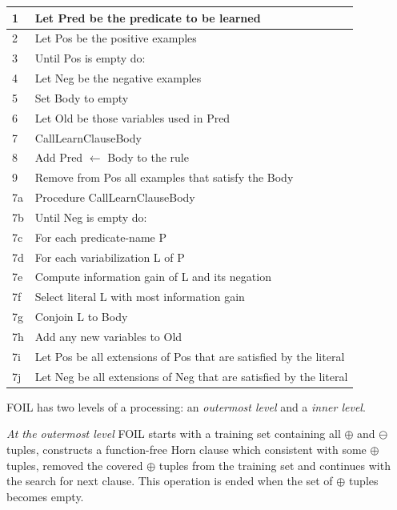 \documentclass{scrartcl}
\begin{document}
\begin{tabular}{|l|l|} %
  \hline
  1 & Let Pred be the predicate to be learned  \\
  \hline
  2 & Let Pos be the positive examples  \\
  \hline
  3 & Until Pos is empty do:  \\
  \hline
  4 &   \qquad Let Neg be the negative examples \\
  \hline
  5 &   \qquad Set Body to empty \\
  \hline
  6 &   \qquad Let Old be those variables used in Pred \\
  \hline
  7 &   \qquad CallLearnClauseBody \\
  \hline
  8 &   \qquad Add Pred $\leftarrow$ Body to the rule \\
  \hline
  9 &   \qquad Remove from Pos all examples that satisfy the Body \\
  \hline
    7a & Procedure CallLearnClauseBody  \\
  \hline
  7b & \qquad Until Neg is empty do:  \\
  \hline
  7c & \qquad\qquad For each predicate-name P  \\
  \hline
  7d & \qquad\qquad For each variabilization L of P  \\
  \hline
  7e & \qquad\qquad Compute information gain of L and its negation \\
  \hline
  7f & \qquad\qquad Select literal L with most information gain \\
  \hline
  7g & \qquad\qquad Conjoin L to Body  \\
  \hline
  7h & \qquad\qquad Add any new variables to Old  \\
  \hline
  7i & \qquad\qquad Let Pos be all extensions of Pos that are satisfied by the literal \\
  \hline
  7j & \qquad\qquad Let Neg be all extensions of Neg that are satisfied by the literal  \\
  \hline
 \end{tabular}

\vspace{6pt}

FOIL has two levels of a processing: an \emph{outermost level} and a \emph{inner level}.

\emph{At the outermost level} FOIL starts with a training set containing
all $\oplus$ and $\ominus$ tuples,
 constructs a function-free Horn clause which consistent with some $\oplus$ tuples,
removed the covered $\oplus$ tuples from the training set
and continues with the search for next clause.
This operation is ended when the set of $\oplus$ tuples becomes empty.
\end{document}
